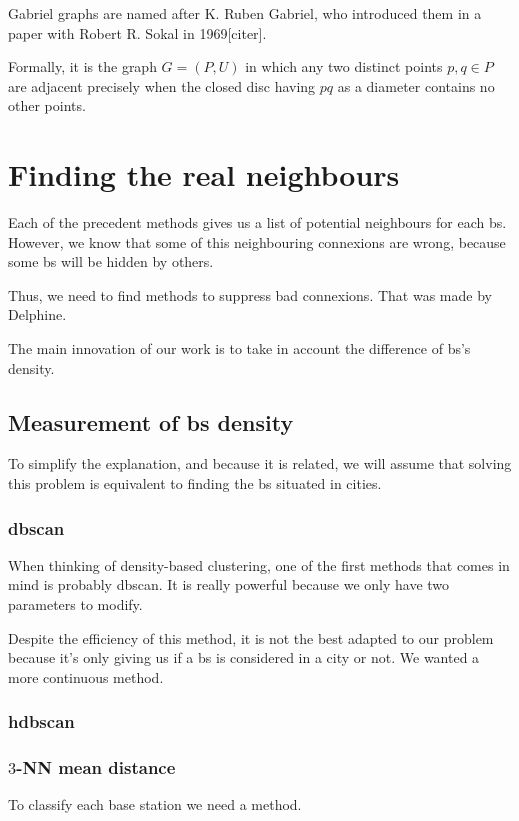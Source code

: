 \documentclass[lettersize,journal,english]{IEEEtran}
\begin{document}
Gabriel graphs are named after K. Ruben Gabriel, who introduced them in a paper with Robert R. Sokal in 1969[citer].

Formally, it is the graph $G = (P, U)$ in which any two distinct points $p, q \in P$ are adjacent precisely when the closed disc having $pq$ as a diameter contains no other points.

\section{Finding the real neighbours}

\noindent Each of the precedent methods gives us a list of potential neighbours for each \acrshort{bs}. However, we know that some of this neighbouring connexions are wrong,
because some \acrshort{bs} will be \og hidden\fg{} by others.

Thus, we need to find methods to suppress bad connexions. That was made by Delphine.

The main innovation of our work is to take in account the difference of \acrshort{bs}'s density.

\subsection{Measurement of \acrshort{bs} density}
\noindent To simplify the explanation, and because it is related, we will assume that solving this problem is equivalent to finding the \acrshort{bs} situated in \og cities\fg{}.

\subsubsection{\acrshort{dbscan}}
When thinking of density-based clustering, one of the first methods that comes in mind is probably \acrshort{dbscan}.
It is really powerful because we only have two parameters to modify.

Despite the efficiency of this method, it is not the best adapted to our problem because it's only giving us if a \acrshort{bs} is considered in a city or not.
We wanted a more continuous method.

\subsubsection{\acrshort{hdbscan}}

\subsubsection{$3$-NN mean distance}
To classify each base station we need a method.
\end{document}
